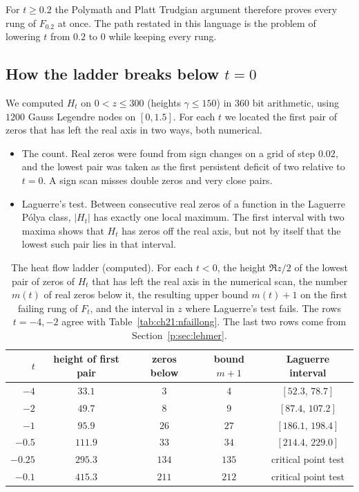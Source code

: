 For $t\ge0.2$ the Polymath and Platt Trudgian argument therefore proves every rung of $F_{0.2}$ at once. The path restated in this language is the problem of lowering $t$ from $0.2$ to $0$ while keeping every rung.

\subsection{How the ladder breaks below \texorpdfstring{$t=0$}{t = 0}}

We computed $H_t$ on $0<z\le300$ (heights $\gamma\le150$) in $360$ bit arithmetic, using $1200$ Gauss Legendre nodes on $[0,1.5]$. For each $t$ we located the first pair of zeros that has left the real axis in two ways, both numerical.
\begin{itemize}
\item The count. Real zeros were found from sign changes on a grid of step $0.02$, and the lowest pair was taken as the first persistent deficit of two relative to $t=0$. A sign scan misses double zeros and very close pairs.
\item Laguerre's test. Between consecutive real zeros of a function in the Laguerre P\'olya class, $|H_t|$ has exactly one local maximum. The first interval with two maxima shows that $H_t$ has zeros off the real axis, but not by itself that the lowest such pair lies in that interval.
\end{itemize}

\begin{table}[t]
\centering
\footnotesize
\begin{tabular}{rcccc}
\toprule
$t$ & height of first pair & zeros below & bound $m+1$ & Laguerre interval\\
\midrule
$-4$ & $33.1$ & $3$ & $4$ & $[52.3,\,78.7]$\\
$-2$ & $49.7$ & $8$ & $9$ & $[87.4,\,107.2]$\\
$-1$ & $95.9$ & $26$ & $27$ & $[186.1,\,198.4]$\\
$-0.5$ & $111.9$ & $33$ & $34$ & $[214.4,\,229.0]$\\
$-0.25$ & $295.3$ & $134$ & $135$ & critical point test\\
$-0.1$ & $415.3$ & $211$ & $212$ & critical point test\\
\bottomrule
\end{tabular}
\caption{The heat flow ladder (computed). For each $t<0$, the height $\Re z/2$ of the lowest pair of zeros of $H_t$ that has left the real axis in the numerical scan, the number $m(t)$ of real zeros below it, the resulting upper bound $m(t)+1$ on the first failing rung of $F_t$, and the interval in $z$ where Laguerre's test fails. The rows $t=-4,-2$ agree with Table~\ref{tab:ch21:nfaillong}. The last two rows come from Section~\ref{p:sec:lehmer}. %
}
\label{p:tab:heat}
\end{table}


